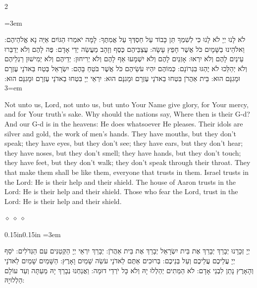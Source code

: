 \documentclass[11pt, openany]{book}
\newenvironment{hebrewblock}{%
  \par\vspace{4pt}
  \begin{adjustwidth}{0.15in}{0.15in}
  \begingroup
  \RTL
  \hebrewfont\large
  \setstretch{1.4}
  \emergencystretch=3em
  \tolerance=9999
  \parindent=0pt\relax
}{%
  \endRTL
  \endgroup
  \end{adjustwidth}
  \par\vspace{2pt}
}
\newcommand{\sederdivider}{%
  \par\vspace{6pt}
  \begin{center}
    \textcolor{sedergold}{\pgfornament[width=1.5cm]{11}}
  \end{center}
  \par\vspace{6pt}
}
\newenvironment{bilingual}{%
  \par\vspace{4pt}%
  \begin{paracol}{2}%
}{%
  \end{paracol}%
  \par\vspace{2pt}%
}
\newenvironment{hebrewcol}{%
  \switchcolumn[1]%
  \begingroup
  \RTL
  \hebrewfont\large
  \setstretch{1.4}%
  \emergencystretch=3em
  \tolerance=9999
  \parindent=0pt\relax
}{%
  \endRTL
  \endgroup
}
\newenvironment{englishcol}{%
  \switchcolumn[0]%
  \begingroup
  \setstretch{1.4}%
  \emergencystretch=3em
  \tolerance=9999
  \normalsize
  \rightskip=0.12in\relax
}{%
  \endgroup
}
\newcommand{\parasep}{%
  \par\vspace{3pt}
  \begin{center}
    \textcolor{sedergold!50}{\tiny$\diamond\;\diamond\;\diamond$}
  \end{center}
  \par\vspace{3pt}
}
\begin{document}
\begin{bilingual}
\begin{hebrewcol}
לֹא לָנוּ יְיָ לֹא לָנוּ כִּי לְשִׁמְךָ תֵּן כָּבוֹד עַל חַסְדְּךָ עַל אֲמִתֶּךָ: לָמָּה יֹאמְרוּ הַגּוֹיִם אַיֵּה נָא אֱלֹהֵיהֶם: וֵאלֹהֵינוּ בַשָּׁמָיִם כֹּל אֲשֶׁר חָפֵץ עָשָׂה: עֲצַבֵּיהֶם כֶּסֶף וְזָהָב מַעֲשֵׂה יְדֵי אָדָם: פֶּה לָהֶם וְלֹא יְדַבֵּרוּ עֵינַיִם לָהֶם וְלֹא יִרְאוּ: אָזְנַיִם לָהֶם וְלֹא יִשְׁמָעוּ אַף לָהֶם וְלֹא יְרִיחוּן: יְדֵיהֶם וְלֹא יְמִישׁוּן רַגְלֵיהֶם וְלֹא יְהַלֵּכוּ לֹא יֶהְגּוּ בִּגְרוֹנָם: כְּמוֹהֶם יִהְיוּ עֹשֵׂיהֶם כֹּל אֲשֶׁר בֹּטֵחַ בָּהֶם: יִשְׂרָאֵל בְּטַח בַּאדֹנָי עֶזְרָם וּמָגִנָּם הוּא: בֵּית אַהֲרֹן בִּטְחוּ בַאדֹנָי עֶזְרָם וּמָגִנָּם הוּא: יִרְאֵי יְיָ בִּטְחוּ בַאדֹנָי עֶזְרָם וּמָגִנָּם הוּא:
\end{hebrewcol}
\begin{englishcol}
Not unto us, Lord, not unto us, but unto Your Name give glory, for Your mercy, and for Your truth's sake. Why should the nations say, Where then is their G-d? And our G-d is in the heavens: He does whatsoever He pleases. Their idols are silver and gold, the work of men's hands. They have mouths, but they don't speak; they have eyes, but they don't see; they have ears, but they don't hear; they have noses, but they don't smell; they have hands, but they don't touch; they have feet, but they don't walk; they don't speak through their throat. They that make them shall be like them, everyone that trusts in them. Israel trusts in the Lord: He is their help and their shield. The house of Aaron trusts in the Lord: He is their help and their shield. Those who fear the Lord, trust in the Lord: He is their help and their shield.
\end{englishcol}
\end{bilingual}
\parasep

\begin{hebrewblock}
יְיָ זְכָרָנוּ יְבָרֵךְ יְבָרֵךְ אֶת בֵּית יִשְׂרָאֵל יְבָרֵךְ אֶת בֵּית אַהֲרֹן: יְבָרֵךְ יִרְאֵי יְיָ הַקְּטַנִּים עִם הַגְּדֹלִים: יֹסֵף יְיָ עֲלֵיכֶם עֲלֵיכֶם וְעַל בְּנֵיכֶם: בְּרוּכִים אַתֶּם לַאדֹנָי עֹשֵׂה שָׁמַיִם וָאָרֶץ: הַשָּׁמַיִם שָׁמַיִם לַאדֹנָי וְהָאָרֶץ נָתַן לִבְנֵי אָדָם: לֹא הַמֵּתִים יְהַלְלוּ יָהּ וְלֹא כָּל יֹרְדֵי דוּמָה: וַאֲנַחְנוּ נְבָרֵךְ יָהּ מֵעַתָּה וְעַד עוֹלָם הַלְלוּיָהּ:
\end{hebrewblock}

\sederdivider
\end{document}
